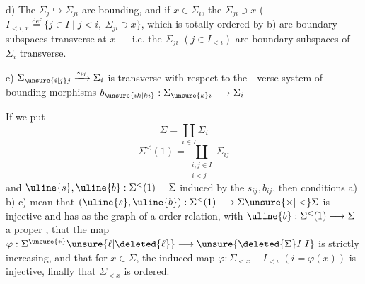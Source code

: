 d)  The $\Sigma_j\hookrightarrow\Sigma_{ji}$ are bounding, and if
$x\in\Sigma_i$,   the $\Sigma_{ji}\ni x$ (
\deleted{$\Sigma$} $I_{<i,x}\overset{\mathrm{def}}{=}\{j\in I\mid j<i,\ \Sigma_{ji}\ni x\}$,
which is totally ordered by b) are
boundary-subspaces transverse at $x$
--- i.e. the $\Sigma_{ji}$ $(j\in I_{<i})$ are
boundary subspaces of $\Sigma_i$ 
transverse.

e) $\Sigma_{\unsure{i|j}j}\xrightarrow{s_{ij}}\Sigma_i$ is transverse with respect to the -
verse system of bounding morphisms
$b_{\unsure{ik|ki}}:\Sigma_{\unsure{k}i}\longrightarrow\Sigma_i$

If we put
\[
\Sigma=\coprod_{i\in I}\Sigma_i
\]
\[
\Sigma^{<}(1)=\coprod_{\substack{i,j\in I\\i<j}}\Sigma_{ij}
\]
and $\uline{s},\uline{b}:\Sigma^{<}(1)\mathrel{-}\Sigma$ induced by the
$s_{ij},b_{ij}$, then conditions a) b) c)
mean that $(\uline{s},\uline{b}):\Sigma^{<}(1)\longrightarrow\Sigma\unsure{\times|<}\Sigma$ is
injective and has as  the graph of a
 order relation, with $\uline{b}:\Sigma^{<}(1)\longrightarrow\Sigma$
a proper ,  that the  map $\varphi:\Sigma^{\unsure{*}}\unsure{\ell|\deleted{\ell}}\longrightarrow\unsure{\deleted{\Sigma}I|I}$
is strictly increasing, and that for  $x\in\Sigma$,
the induced map $\varphi:\Sigma_{<x}\mathrel{-}I_{<i}$ $(i=\varphi(x))$ is
injective, finally that $\Sigma_{<x}$ is  ordered.

